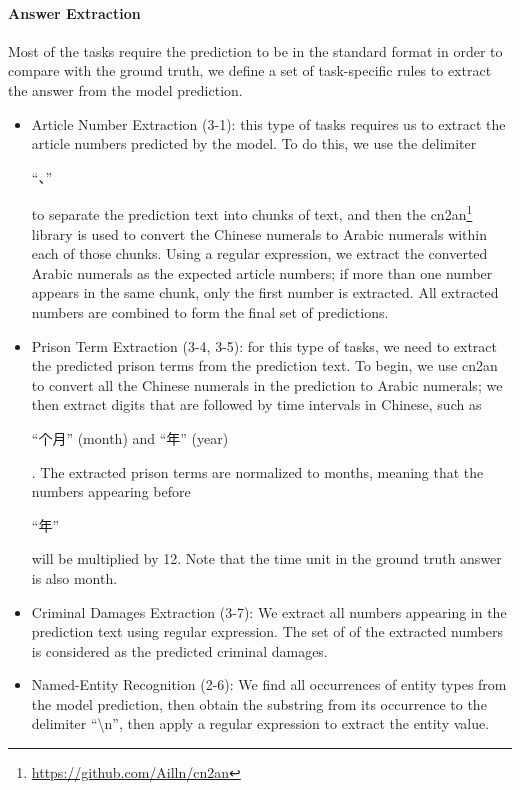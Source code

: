 \paragraph{Answer Extraction}
Most of the tasks require the prediction to be in the standard format in order to compare with the ground truth, we define a set of task-specific rules to extract the answer from the model prediction.
\begin{itemize}
    \item Article Number Extraction (3-1): this type of tasks requires us to extract the article numbers predicted by the model. To do this, we use the delimiter \begin{CJK*}{UTF8}{gbsn} ``、'' \end{CJK*} to separate the prediction text into chunks of text, and then the cn2an\footnote{\url{https://github.com/Ailln/cn2an}} library is used to convert the Chinese numerals to Arabic numerals within each of those chunks. Using a regular expression, we extract the converted Arabic numerals as the expected article numbers; if more than one number appears in the same chunk, only the first number is extracted. All extracted numbers are combined to form the final set of predictions.
    \item Prison Term Extraction (3-4, 3-5): for this type of tasks, we need to extract the predicted prison terms from the prediction text. To begin, we use cn2an to convert all the Chinese numerals in the prediction to Arabic numerals; we then extract digits that are followed by time intervals in Chinese, such as \begin{CJK*}{UTF8}{gbsn} ``个月'' (month) and ``年'' (year)\end{CJK*}. The extracted prison terms are normalized to months, meaning that the numbers appearing before \begin{CJK*}{UTF8}{gbsn} ``年'' \end{CJK*} will be multiplied by 12. Note that the time unit in the ground truth answer is also month.
    \item Criminal Damages Extraction (3-7): We extract all numbers appearing in the prediction text using regular expression. The set of of the extracted numbers is considered as the predicted criminal damages.
    \item Named-Entity Recognition (2-6): We find all occurrences of entity types from the model prediction, then obtain the substring from its occurrence to the delimiter ``\textbackslash n'', then apply a regular expression to extract the entity value.

\end{itemize}
